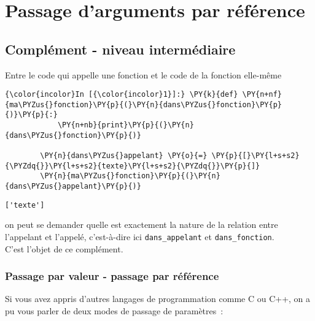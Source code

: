     \hypertarget{passage-darguments-par-ruxe9fuxe9rence}{%
\section{Passage d'arguments par
référence}\label{passage-darguments-par-ruxe9fuxe9rence}}

    \hypertarget{compluxe9ment---niveau-intermuxe9diaire}{%
\subsection{Complément - niveau
intermédiaire}\label{compluxe9ment---niveau-intermuxe9diaire}}

    Entre le code qui appelle une fonction et le code de la fonction
elle-même

    \begin{Verbatim}[commandchars=\\\{\}]
{\color{incolor}In [{\color{incolor}1}]:} \PY{k}{def} \PY{n+nf}{ma\PYZus{}fonction}\PY{p}{(}\PY{n}{dans\PYZus{}fonction}\PY{p}{)}\PY{p}{:}
            \PY{n+nb}{print}\PY{p}{(}\PY{n}{dans\PYZus{}fonction}\PY{p}{)}
            
        \PY{n}{dans\PYZus{}appelant} \PY{o}{=} \PY{p}{[}\PY{l+s+s2}{\PYZdq{}}\PY{l+s+s2}{texte}\PY{l+s+s2}{\PYZdq{}}\PY{p}{]}
        \PY{n}{ma\PYZus{}fonction}\PY{p}{(}\PY{n}{dans\PYZus{}appelant}\PY{p}{)}
\end{Verbatim}


    \begin{Verbatim}[commandchars=\\\{\}]
['texte']

    \end{Verbatim}

    on peut se demander quelle est exactement la nature de la relation entre
l'appelant et l'appelé, c'est-à-dire ici \texttt{dans\_appelant} et
\texttt{dans\_fonction}.\\

C'est l'objet de ce complément.

    \hypertarget{passage-par-valeur---passage-par-ruxe9fuxe9rence}{%
\subsubsection{Passage par valeur - passage par
référence}\label{passage-par-valeur---passage-par-ruxe9fuxe9rence}}

    Si vous avez appris d'autres langages de programmation comme C ou C++,
on a pu vous parler de deux modes de passage de paramètres~:

